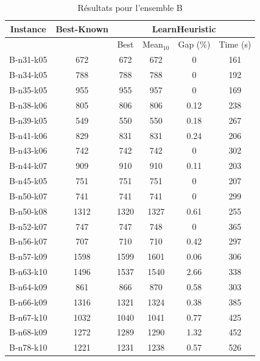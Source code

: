 \documentclass[a4paper,11pt]{article}%
\begin{document}
\begin{table}[h!]
\caption{Résultats pour l'ensemble B}
\label{TB}
\begin{center}
\begin{tabular}{|@{}c@{}|@{}c@{}|@{}c@{}|@{}c@{}|@{}c@{}|@{}c@{}|}

\hline
 Instance & Best-Known & \multicolumn{4}{c|}{LearnHeuristic}  \\
 \hline
 & & Best & Mean$_{10}$ & Gap (\%) & Time (s) \\ 
 \hline
 B-n31-k05 & 672 & 672 & 672 & 0 & 161 \\
 \hline
 B-n34-k05   & 788 & 788 & 788 &0 & 192  \\
  \hline
   B-n35-k05 & 955 & 955 & 957 &0 & 169  \\
 \hline
   B-n38-k06 & 805 & 806 & 806 &0.12 & 238  \\
  \hline
   B-n39-k05 & 549 & 550 & 550 & 0.18 & 267  \\
 \hline
  B-n41-k06  & 829 & 831 & 831 & 0.24 & 206  \\
  \hline
  B-n43-k06 & 742 & 742 & 742 & 0 & 302 \\
 \hline
  B-n44-k07  & 909 & 910 & 910 & 0.11 & 203 \\
 \hline
 B-n45-k05 & 751 & 751 & 751 & 0 & 207 \\
 \hline
   B-n50-k07 & 741 & 741 & 741 & 0 & 299   \\
  \hline
   B-n50-k08 & 1312 & 1320 & 1327 & 0.61 & 255  \\
  \hline
  B-n52-k07  & 747 & 747 & 748 &0 & 365  \\
  \hline
  B-n56-k07 & 707 & 710 & 710 & 0.42 & 297  \\
 \hline
  B-n57-k09  & 1598 & 1599 & 1601 &0.06 & 306   \\
  \hline
  B-n63-k10  & 1496 & 1537 & 1540 & 2.66 & 338   \\
  \hline
  B-n64-k09 & 861 & 866 & 870 & 0.58 & 303 \\
 \hline 
   B-n66-k09 & 1316 & 1321 & 1324 &0.38 & 385   \\
  \hline 
  B-n67-k10  & 1032 & 1040 & 1041 & 0.77 & 425  \\
  \hline
    B-n68-k09  & 1272 & 1289 & 1290 &1.32 & 452   \\
  \hline
    B-n78-k10  & 1221 & 1231 & 1238 & 0.57 & 526 \\
  \hline
\end{tabular}
\end{center}
\end{table}
\end{document}
